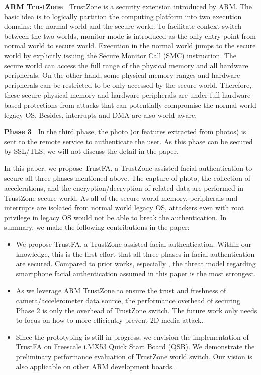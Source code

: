 \noindent
{\bf ARM TrustZone~}
TrustZone is a security extension introduced by ARM. The basic idea is to
logically partition the computing platform into two execution domains: the
normal world and the secure world.  To facilitate context switch between the two
worlds, monitor mode is introduced as the only entry point from normal world to
secure world.  Execution in the normal world jumps to the secure world by
explicitly issuing the Secure Monitor Call (SMC) instruction.  The secure world
can access the full range of the physical memory and all hardware peripherals.
On the other hand, some physical memory ranges and hardware peripherals can be
restricted to be only accessed by the secure world. Therefore, these secure
physical memory and hardware peripherals are under full hardware-based
protections from attacks that can potentially compromise the normal world legacy
OS.  Besides, interrupts and DMA are also world-aware.

\noindent
{\bf Phase 3~}
In the third phase, the photo (or features extracted from photos) is sent to the remote service to
authenticate the user. As this phase can be secured by SSL/TLS, we will not
discuss the detail in the paper.

In this paper, we propose TrustFA, a TrustZone-assisted facial authentication
to secure all three phases mentioned above.  The capture of photo, the
collection of accelerations, and the encryption/decryption of related data are
performed in TrustZone secure world.  As all of the secure world memory,
peripherals and interrupts are isolated from normal world legacy OS, attackers
even with root privilege in legacy OS would not be able to break the
authentication.  In summary, we make the following contributions in the paper: 
\begin{itemize}
\item We propose TrustFA, a TrustZone-assisted facial authentication.  Within
our knowledge, this is the first effort that all three phases in facial
authentication are secured. Compared to prior works, especially
\cite{Chen-Sensor}, the threat model regarding smartphone facial authentication
assumed in this paper is the most strongest.

\item As we leverage ARM TrustZone to ensure the trust and freshness of
camera/accelerometer data source, the performance overhead of securing Phase 2 is
only the overhead of TrustZone switch.  The future work only needs to
focus on how to more efficiently prevent 2D media attack.

\item Since the prototyping is still in progress, we envision the implementation of TrustFA on Freescale i.MX53 Quick Start
Board (QSB). We demonstrate the preliminary performance evaluation of TrustZone
world switch. Our vision is also applicable on other ARM development boards.
\end{itemize}
